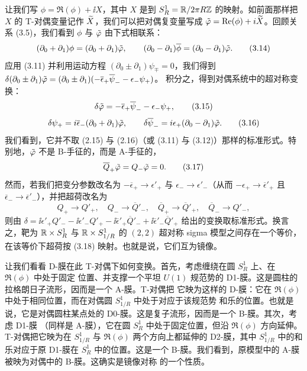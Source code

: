 让我们写 $\phi=\Re(\phi)+\ii X$，其中 $X$ 是到 $S^1_R=\mathbb{R}/2\pi R\mathbb{Z}$ 的映射。如前面那样把 $X$ 的
T-对偶变量记作 $\widetilde{X}$，我们可以把对偶复变量写成 $\tilde\varphi=\operatorname{Re}(\phi)+i\widetilde{X}$。回顾关系 (3.5)，我们看到
$\phi$ 与 $\tilde\varphi$ 由下式相联系：
\begin{equation}
  (\partial_0+\partial_1)\phi=(\partial_0+\partial_1)\tilde\varphi,\qquad
  (\partial_0-\partial_1)\overline{\phi}=(\partial_0-\partial_1)\tilde\varphi. \tag{3.14}
\end{equation}
应用 (3.11) 并利用运动方程 $(\partial_0\pm\partial_1)\psi_\mp=0$，我们得到
$\delta(\partial_0\pm\partial_1)\tilde\varphi=(\partial_0\pm\partial_1)(-\overline{\epsilon}_+\overline{\psi}_--\epsilon_-\psi_+)$。
积分之，得到对偶系统中的超对称变换：
\begin{equation}
  \delta\tilde\varphi=-\overline{\epsilon}_+\overline{\psi}_--\epsilon_-\psi_+, \tag{3.15}
\end{equation}
\begin{equation}
  \delta\psi_+=i\overline{\epsilon}_-(\partial_0+\partial_1)\tilde\varphi,\qquad
  \delta\overline{\psi}_-=i\epsilon_+(\partial_0-\partial_1)\tilde\varphi. \tag{3.16}
\end{equation}
我们看到，它并不取 (2.15) 与 (2.16)（或 (3.11) 与 (3.12)）那样的标准形式。特别地，$\tilde\varphi$ 不是
B-手征的，而是 A-手征的，
\begin{equation}
  \overline{Q}_+\tilde\varphi=Q_-\tilde\varphi=0. \tag{3.17}
\end{equation}
然而，若我们把变分参数改名为 $-\overline{\epsilon}_+\to\epsilon'_+$ 与
$\epsilon_-\to\epsilon'_-$（从而 $-\epsilon_+\to\overline{\epsilon}'_+$ 且
$\overline{\epsilon}_-\to\overline{\epsilon}'_-$），并把超荷改名为
\begin{equation}
  Q_+\to Q'_+,\quad Q_-\to\overline{Q}'_-,\quad
  \overline{Q}_+\to\overline{Q}'_+,\quad \overline{Q}_-\to Q'_-,
  \tag{3.18}
\end{equation}
则由 $\delta=\ii\epsilon'_+Q'_--\ii\epsilon'_-Q'_+-\ii\overline{\epsilon}'_+\overline{Q}'_-+\ii\overline{\epsilon}'_-\overline{Q}'_+$
给出的变换取标准形式。换言之，靶为 $\mathbb{R}\times S^1_R$ 与 $\mathbb{R}\times S^1_{1/R}$ 的 $(2,2)$ 超对称 sigma
模型之间存在一个等价，在该等价下超荷按 (3.18) 映射。也就是说，它们互为镜像。

让我们看看 D-膜在此 T-对偶下如何变换。首先，考虑缠绕在圆 $S^1_R$ 上、在 $\Re(\phi)$ 中处于固定
位置、并支撑一个平坦 $U(1)$ 规范势的 D1-膜。这是圆柱的拉格朗日子流形，因而是一个 A-膜。T-对偶把
它映为这样的 D-膜：它在 $\Re(\phi)$ 中处于相同位置，而在对偶圆 $S^1_{1/R}$ 中处于对应于该规范势
和乐的位置。也就是说，它是对偶圆柱某点处的 D0-膜。这是复子流形，因而是一个 B-膜。其次，考虑 D1-膜
（同样是 A-膜），它在圆 $S^1_R$ 中处于固定位置，但沿 $\Re(\phi)$ 方向延伸。T-对偶把它映为在
$S^1_{1/R}$ 与 $\Re(\phi)$ 两个方向上都延伸的 D2-膜，其中 $S^1_{1/R}$ 中的和乐对应于原 D1-膜在
$S^1_R$ 中的位置。这是一个 B-膜。我们看到，原模型中的 A-膜被映为对偶中的 B-膜。这确实是镜像对称
的一个性质。

